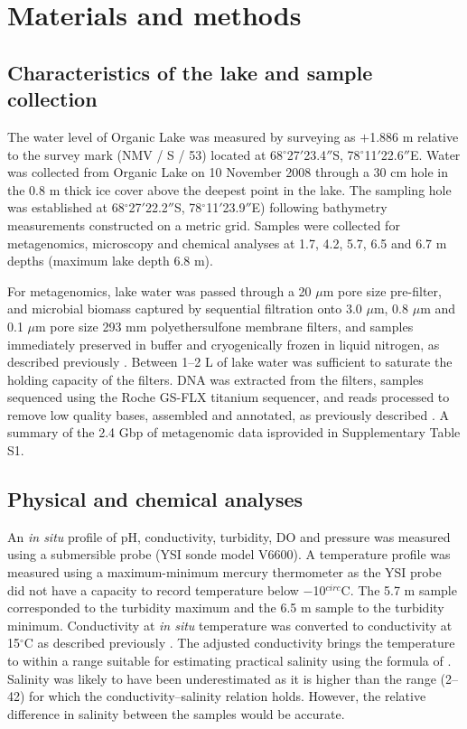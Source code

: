 \section{Materials and methods}
\subsection{Characteristics of the lake and sample collection}
The water level of Organic Lake was measured by surveying as $+$1.886 m relative to the survey mark (NMV / S / 53) located at 68$^{\circ}$27$'$23.4$''$S, 78$^{\circ}$11$'$22.6$''$E.
Water was collected from Organic Lake on 10 November 2008 through a 30 cm hole in the 0.8 m thick ice cover above the deepest point in the lake. 
The sampling hole was established at 68$^{\circ}$27$'$22.2$''$S, 78$^{\circ}$11$'$23.9$''$E) following bathymetry measurements constructed on a metric grid. 
Samples were collected for metagenomics, microscopy and chemical analyses at 1.7, 4.2, 5.7, 6.5 and 6.7 m depths (maximum lake depth 6.8 m).

For metagenomics, lake water was passed through a 20 $\mu$m pore size pre-filter, and microbial biomass captured by sequential filtration onto 3.0 $\mu$m, 0.8 $\mu$m and 0.1 $\mu$m pore size 293 mm polyethersulfone membrane filters, and samples immediately preserved in buffer and cryogenically frozen in liquid nitrogen, as described previously \cite{Ng2010a, Lauro2011}. 
Between 1--2 L of lake water was sufficient to saturate the holding capacity of the filters. 
\ac{DNA} was extracted from the filters, samples sequenced using the Roche GS-FLX titanium sequencer, and reads processed to remove low quality bases, assembled and annotated, as previously described \cite{Ng2010a, Lauro2011}. 
A summary of the 2.4 Gbp of metagenomic data isprovided in Supplementary Table S1.

\subsection{Physical and chemical analyses}
An \emph{in situ} profile of pH, conductivity, turbidity, \ac{DO} and pressure was measured using a submersible probe (YSI sonde model V6600). 
A temperature profile was measured using a maximum-minimum mercury thermometer as the YSI probe did not have a capacity to record temperature below $-$10$^{circ}$C. 
The 5.7 m sample corresponded to the turbidity maximum and the 6.5 m sample to the turbidity minimum. 
Conductivity at \emph{in situ} temperature was converted to conductivity at 15$^{\circ}$C as described previously \cite{Gibson1999}. 
The adjusted conductivity brings the temperature to within a range suitable for estimating practical salinity using the formula of \citet{Fofonoff1983}. 
Salinity was likely to have been underestimated as it is higher than the range (2--42) for which the conductivity--salinity relation holds. 
However, the relative difference in salinity between the samples would be accurate. 

